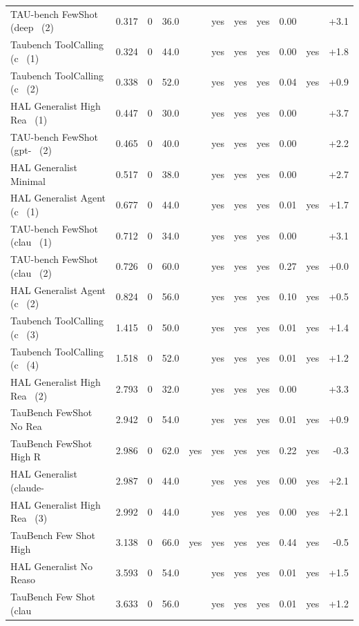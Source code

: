 {\begin{longtable}{lrrrcccccrr}
TAU-bench FewShot (deep~ (2) & 0.317 & 0 & 36.0 &  & yes & yes & yes & 0.00 &  & +3.1 \\
Taubench ToolCalling (c~ (1) & 0.324 & 0 & 44.0 &  & yes & yes & yes & 0.00 & yes & +1.8 \\
Taubench ToolCalling (c~ (2) & 0.338 & 0 & 52.0 &  & yes & yes & yes & 0.04 & yes & +0.9 \\
HAL Generalist High Rea~ (1) & 0.447 & 0 & 30.0 &  & yes & yes & yes & 0.00 &  & +3.7 \\
TAU-bench FewShot (gpt-~ (2) & 0.465 & 0 & 40.0 &  & yes & yes & yes & 0.00 &  & +2.2 \\
HAL Generalist Minimal ~ & 0.517 & 0 & 38.0 &  & yes & yes & yes & 0.00 &  & +2.7 \\
HAL Generalist Agent (c~ (1) & 0.677 & 0 & 44.0 &  & yes & yes & yes & 0.01 & yes & +1.7 \\
TAU-bench FewShot (clau~ (1) & 0.712 & 0 & 34.0 &  & yes & yes & yes & 0.00 &  & +3.1 \\
TAU-bench FewShot (clau~ (2) & 0.726 & 0 & 60.0 &  & yes & yes & yes & 0.27 & yes & +0.0 \\
HAL Generalist Agent (c~ (2) & 0.824 & 0 & 56.0 &  & yes & yes & yes & 0.10 & yes & +0.5 \\
Taubench ToolCalling (c~ (3) & 1.415 & 0 & 50.0 &  & yes & yes & yes & 0.01 & yes & +1.4 \\
Taubench ToolCalling (c~ (4) & 1.518 & 0 & 52.0 &  & yes & yes & yes & 0.01 & yes & +1.2 \\
HAL Generalist High Rea~ (2) & 2.793 & 0 & 32.0 &  & yes & yes & yes & 0.00 &  & +3.3 \\
TauBench FewShot No Rea~ & 2.942 & 0 & 54.0 &  & yes & yes & yes & 0.01 & yes & +0.9 \\
TauBench FewShot High R~ & 2.986 & 0 & 62.0 & yes & yes & yes & yes & 0.22 & yes & -0.3 \\
HAL Generalist (claude-~ & 2.987 & 0 & 44.0 &  & yes & yes & yes & 0.00 & yes & +2.1 \\
HAL Generalist High Rea~ (3) & 2.992 & 0 & 44.0 &  & yes & yes & yes & 0.00 & yes & +2.1 \\
TauBench Few Shot High ~ & 3.138 & 0 & 66.0 & yes & yes & yes & yes & 0.44 & yes & -0.5 \\
HAL Generalist No Reaso~ & 3.593 & 0 & 54.0 &  & yes & yes & yes & 0.01 & yes & +1.5 \\
TauBench Few Shot (clau~ & 3.633 & 0 & 56.0 &  & yes & yes & yes & 0.01 & yes & +1.2 \\
\end{longtable}

}
